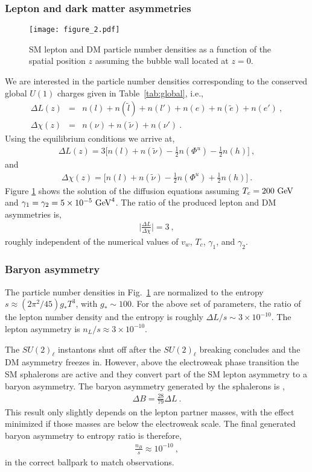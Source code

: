 \documentclass[prd,showpcs,amsmath,amssymb,nofootinbib,preprintnumbers,balancelastpage,longbibliography,superscriptaddress,notitlepage]{revtex4}
\def\bea{\begin{eqnarray}}
\def\eea{\end{eqnarray}}
\def\bea{\begin{eqnarray}}
\def\eea{\end{eqnarray}}
\begin{document}
\subsubsection{Lepton and dark matter asymmetries}

\begin{figure}[t!]
  \centering
      \texttt{[image: figure\_2.pdf]}\vspace{-7mm}
  \caption{\small{SM lepton and DM particle number densities as a function of the spatial position $z$ assuming the bubble wall located at $z=0$.}}
  \label{fig:diff_sol}
\end{figure}

We are interested in the particle number densities corresponding to the conserved global $U(1)$ charges given in Table~{\ref{tab:global}}, i.e.,
\bea
 \Delta L (z) &=&  n(l) + n(\tilde{l}) + n(l') + n(e) + n(\tilde{e})  + n(e')\ ,\nonumber\\
\Delta \chi (z) &=& n(\nu) + n(\tilde{\nu}) + n(\nu')\ . 
\eea
Using the equilibrium conditions we arrive at,
\bea
 \Delta L (z) = 3\Big[n(l) + n(\tilde{\nu}) -\frac{1}{2}n(\Phi^u) - \frac{1}{2}n(h)\Big] \ ,
\eea
and
\bea
 \Delta \chi (z) = \Big[n(l) + n(\tilde{\nu}) - \frac{1}{2}n(\Phi^u) + \frac{1}{2}n(h)\Big] \ .
\eea
Figure \ref{fig:diff_sol}  shows the solution of the diffusion equations assuming $T_c = 200 \ \rm GeV$ and $\gamma_1 = \gamma_2 = 5 \times 10^{-5} \ {\rm GeV}^4$. The ratio of the produced lepton and DM asymmetries is,
\bea
\bigg|\frac{\Delta L}{\Delta \chi} \bigg| = 3 \ ,
\label{3/2}
\eea
roughly independent of the numerical values of $v_w$, $T_c$, $\gamma_1$, and $\gamma_2$.



\subsubsection{Baryon asymmetry}

The particle number densities in Fig.~\ref{fig:diff_sol}  are normalized to the entropy $s \approx (2\pi^2/45) g_*T^3$, with $g_*\sim 100$. For the above set of parameters, the ratio of the lepton number density and the entropy is roughly
$\Delta L/s\sim 3\times 10^{-10}$. The lepton asymmetry is
$n_L/s \approx 3\times 10^{-10}$. 


 

The $SU(2)_\ell$ instantons shut off after the $SU(2)_\ell$ breaking concludes and the DM asymmetry freezes in. However, above the electroweak phase transition the SM sphalerons are active and they convert part of the SM lepton asymmetry to a baryon asymmetry. The baryon asymmetry generated by the sphalerons is \cite{Harvey:1990qw},
\bea
\Delta B = \frac{28}{79} \Delta L \ .
\label{B_asym}
\eea
This result only slightly depends on the lepton partner masses, with the effect minimized if those masses are below the electroweak scale. The final generated baryon asymmetry to entropy ratio is therefore,
\bea
\frac{n_B}{s} \approx 10^{-10} \ ,
\eea
in the correct ballpark to match observations.\\
\end{document}
